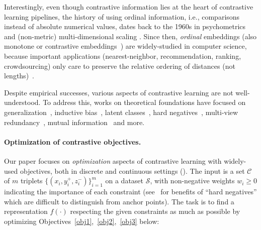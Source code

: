 \documentclass{article}
\theoremstyle{definition}  %
\theoremstyle{plain}
\numberwithin{observation}{section}
\numberwithin{claim}{section}
\numberwithin{fact}{section}
\numberwithin{lemma}{section}
\numberwithin{proposition}{section}
\numberwithin{theorem}{section}
\numberwithin{corollary}{section}
\numberwithin{definition}{section}
\newcommand{\x}{x}
\newcommand{\y}{y}
\newcommand{\z}{z}
\newcommand{\anc}{\x}
\newcommand{\pos}{\y}
\renewcommand{\neg}{\z}
\theoremstyle{plain}
\begin{document}
Interestingly, even though contrastive information lies at the heart of contrastive learning pipelines, the history of using ordinal information, i.e., comparisons instead of absolute numerical values, dates back to the 1960s in psychometrics and (non-metric) multi-dimensional scaling %
\citep{torgerson1952multidimensional,thurstone1954measurement,kruskal1964nonmetric}. %
Since then, \textit{ordinal} embeddings (also monotone or contrastive embeddings~\citep{bilu2005monotone,chen2022learning,chatziafratis2024dimension}) are widely-studied in computer science, because important applications (nearest-neighbor, recommendation, ranking, crowdsourcing) only care to preserve the relative ordering of distances (not  lengths)~\citep{agarwal2007generalized,buadoiu2008ordinal,tamuz2011adaptively,vankadara2019insights,ghosh2019landmark}.

Despite empirical successes, various aspects of contrastive learning are not well-understood. To address this, works on theoretical foundations have focused on generalization~\citep{alon2023optimal}, inductive bias~\citep{saunshi2022understanding,haochen2022theoretical}, latent classes~\citep{saunshi2019theoretical}, hard negatives~\citep{robinson2020contrastive,kalantidis2020hard,awasthi2022more}, multi-view redundancy~\citep{tosh2021contrastive}, mutual information~\citep{oord2018representation,hjelm2018learning} and more. 

\vspace{-0.2cm}
\paragraph{Optimization of contrastive objectives.} Our paper focuses on \textit{optimization} aspects of contrastive learning with widely-used objectives, both in discrete and continuous settings (). The input is a set $\mathcal{C}$ of $m$ triplets $\{(\anc_i, \pos_i^+, \neg_{i}^-)\}_{i = 1}^m$ on a dataset $\mathcal{S}$, with non-negative weights $w_i \ge 0$ indicating the importance of each constraint (see~\citep{robinson2020contrastive,kalantidis2020hard} for benefits of ``hard  negatives'' which are difficult to distinguish from anchor points). The task is to find a representation $f(\cdot)$ respecting the given constraints as much as possible by optimizing Objectives~\ref{obj1},~\ref{obj2},~\ref{obj3} below:%
\end{document}
